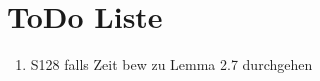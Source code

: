 \chapter{ToDo Liste}
\label{chap:todo}

\begin{enumerate}
	\item S128 falls Zeit bew zu Lemma 2.7 durchgehen
\end{enumerate}